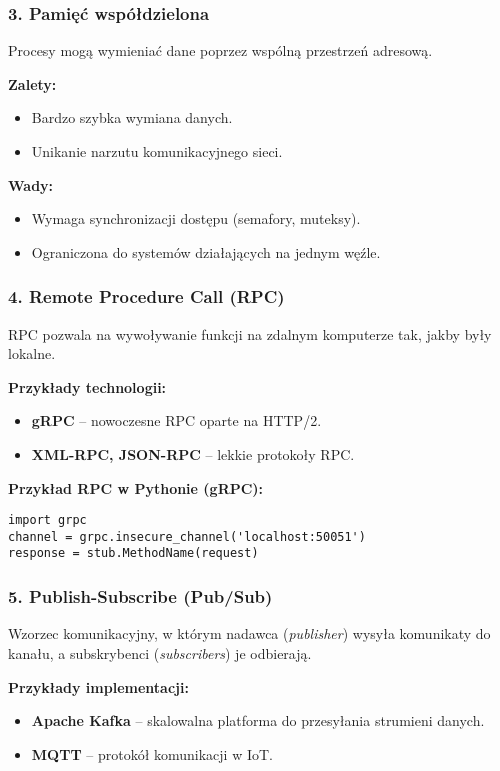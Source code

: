 \subsubsection{3. Pamięć współdzielona}
Procesy mogą wymieniać dane poprzez wspólną przestrzeń adresową.

\textbf{Zalety:}
\begin{itemize}
    \item Bardzo szybka wymiana danych.
    \item Unikanie narzutu komunikacyjnego sieci.
\end{itemize}

\textbf{Wady:}
\begin{itemize}
    \item Wymaga synchronizacji dostępu (semafory, muteksy).
    \item Ograniczona do systemów działających na jednym węźle.
\end{itemize}

\subsubsection{4. Remote Procedure Call (RPC)}
RPC pozwala na wywoływanie funkcji na zdalnym komputerze tak, jakby były lokalne.

\textbf{Przykłady technologii:}
\begin{itemize}
    \item \textbf{gRPC} – nowoczesne RPC oparte na HTTP/2.
    \item \textbf{XML-RPC, JSON-RPC} – lekkie protokoły RPC.
\end{itemize}

\textbf{Przykład RPC w Pythonie (gRPC):}
\begin{verbatim}
import grpc
channel = grpc.insecure_channel('localhost:50051')
response = stub.MethodName(request)
\end{verbatim}

\subsubsection{5. Publish-Subscribe (Pub/Sub)}
Wzorzec komunikacyjny, w którym nadawca (\textit{publisher}) wysyła komunikaty do kanału, a subskrybenci (\textit{subscribers}) je odbierają.

\textbf{Przykłady implementacji:}
\begin{itemize}
    \item \textbf{Apache Kafka} – skalowalna platforma do przesyłania strumieni danych.
    \item \textbf{MQTT} – protokół komunikacji w IoT.
\end{itemize}

